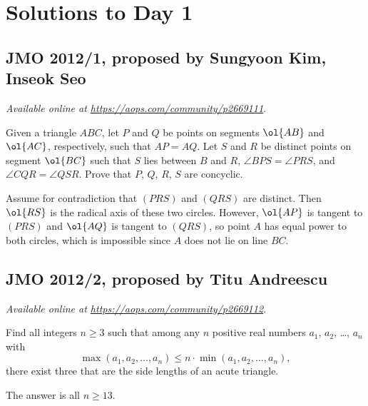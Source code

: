 \documentclass[11pt]{scrartcl}
\begin{document}
\section{Solutions to Day 1}
\subsection{JMO 2012/1, proposed by Sungyoon Kim, Inseok Seo}
\textsl{Available online at \url{https://aops.com/community/p2669111}.}
\begin{mdframed}[style=mdpurplebox,frametitle={Problem statement}]
Given a triangle $ABC$, let $P$ and $Q$ be points
on segments $\ol{AB}$ and $\ol{AC}$, respectively, such that $AP=AQ$.
Let $S$ and $R$ be distinct points on segment $\ol{BC}$
such that $S$ lies between $B$ and $R$,
$\angle BPS=\angle PRS$, and $\angle CQR=\angle QSR$.
Prove that $P$, $Q$, $R$, $S$ are concyclic.
\end{mdframed}
Assume for contradiction that $(PRS)$ and $(QRS)$ are distinct.
Then $\ol{RS}$ is the radical axis of these two circles.
However, $\ol{AP}$ is tangent to $(PRS)$
and $\ol{AQ}$ is tangent to $(QRS)$,
so point $A$ has equal power to both circles,
which is impossible since $A$ does not lie on line $BC$.
\pagebreak

\subsection{JMO 2012/2, proposed by Titu Andreescu}
\textsl{Available online at \url{https://aops.com/community/p2669112}.}
\begin{mdframed}[style=mdpurplebox,frametitle={Problem statement}]
Find all integers $n \ge 3$ such that
among any $n$ positive real numbers
$a_1$, $a_2$, \dots, $a_n$ with
\[ \max(a_1,a_2,\dots,a_n)
  \le n \cdot \min(a_1,a_2,\dots,a_n), \]
there exist three that are the side lengths
of an acute triangle.
\end{mdframed}
The answer is all $n \ge 13$.
\end{document}
